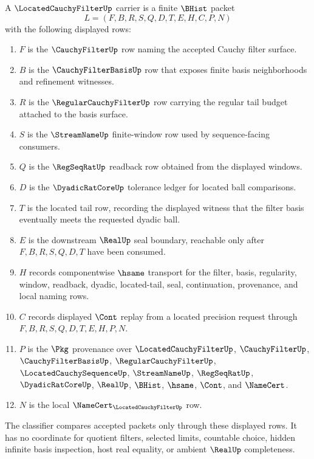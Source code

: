 \begin{definition}
\label{def:located-cauchy-filter-carrier}
A $\LocatedCauchyFilterUp$ carrier is a finite $\BHist$ packet
$$
L=(F,B,R,S,Q,D,T,E,H,C,P,N)
$$
with the following displayed rows:
\begin{enumerate}
\item $F$ is the $\CauchyFilterUp$ row naming the accepted Cauchy filter surface.
\item $B$ is the $\CauchyFilterBasisUp$ row that exposes finite basis neighborhoods and refinement witnesses.
\item $R$ is the $\RegularCauchyFilterUp$ row carrying the regular tail budget attached to the basis surface.
\item $S$ is the $\StreamNameUp$ finite-window row used by sequence-facing consumers.
\item $Q$ is the $\RegSeqRatUp$ readback row obtained from the displayed windows.
\item $D$ is the $\DyadicRatCoreUp$ tolerance ledger for located ball comparisons.
\item $T$ is the located tail row, recording the displayed witness that the filter basis eventually meets the requested dyadic ball.
\item $E$ is the downstream $\RealUp$ seal boundary, reachable only after $F,B,R,S,Q,D,T$ have been consumed.
\item $H$ records componentwise $\hsame$ transport for the filter, basis, regularity, window, readback, dyadic, located-tail, seal, continuation, provenance, and local naming rows.
\item $C$ records displayed $\Cont$ replay from a located precision request through $F,B,R,S,Q,D,T,E,H,P,N$.
\item $P$ is the $\Pkg$ provenance over $\LocatedCauchyFilterUp$, $\CauchyFilterUp$, $\CauchyFilterBasisUp$, $\RegularCauchyFilterUp$, $\LocatedCauchySequenceUp$, $\StreamNameUp$, $\RegSeqRatUp$, $\DyadicRatCoreUp$, $\RealUp$, $\BHist$, $\hsame$, $\Cont$, and $\NameCert$.
\item $N$ is the local $\NameCert_{\LocatedCauchyFilterUp}$ row.
\end{enumerate}
The classifier compares accepted packets only through these displayed rows. It has no coordinate for quotient filters, selected limits, countable choice, hidden infinite basis inspection, host real equality, or ambient $\RealUp$ completeness.
\end{definition}

